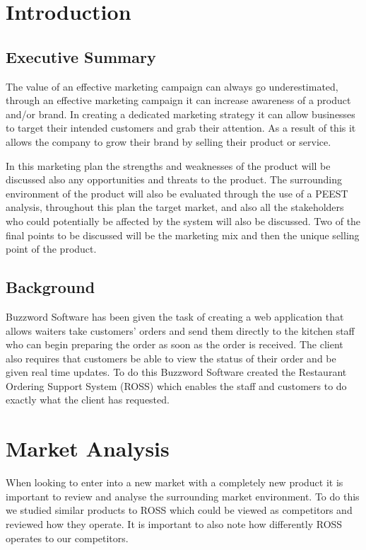 \documentclass[11pt, oneside, a4paper]{report}   %
\begin{document}
\section{Introduction}
\subsection{Executive Summary}
\begin{flushleft}
	The value of an effective marketing campaign can always go underestimated, through an effective marketing campaign it can increase awareness of a product and/or brand. In creating a dedicated marketing strategy it can allow businesses to target their intended customers and grab their attention. As a result of this it allows the company to grow their brand by selling their product or service.
	
	In this marketing plan the strengths and weaknesses of the product will be discussed also any opportunities and threats to the product. The surrounding environment of the product will also be evaluated through the use of a PEEST analysis, throughout this plan the target market, and also all the stakeholders who could potentially be affected by the system will also be discussed. Two of the final points to be discussed will be the marketing mix and then the unique selling point of the product.
	
	\subsection{Background}
	Buzzword Software has been given the task of creating a web application that allows waiters take customers’ orders and send them directly to the kitchen staff who can begin preparing the order as soon as the order is received. The client also requires that customers be able to view the status of their order and be given real time updates. To do this Buzzword Software created the Restaurant Ordering Support System (ROSS) which enables the staff and customers to do exactly what the client has requested.


\newpage
\section{Market Analysis}
When looking to enter into a new market with a completely new product it is important to review and analyse the surrounding market environment. To do this we studied similar products to ROSS which could be viewed as competitors and reviewed how they operate. It is important to also note how differently ROSS operates to our competitors. 


\end{flushleft}
\end{document}
